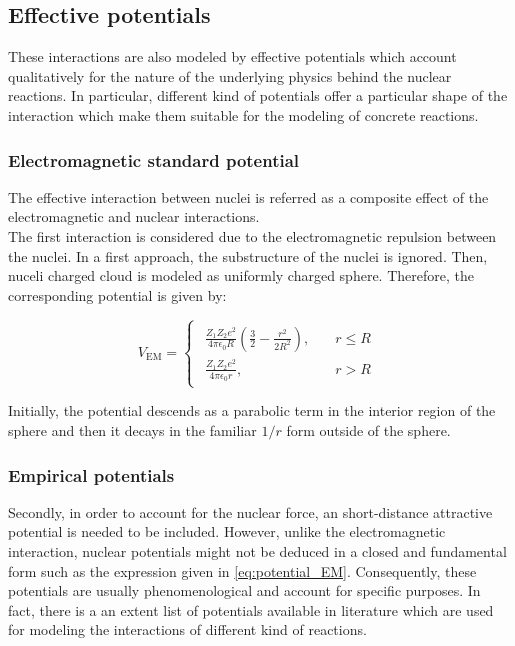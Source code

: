 \documentclass[openany]{book}
\begin{document}
\subsection{Effective potentials} \label{sub:potential_effective}

These interactions are also modeled by effective potentials which account qualitatively for the nature of the underlying physics behind the nuclear reactions. In particular, different kind of potentials offer a particular shape of the interaction which make them suitable for the modeling of concrete reactions.

\subsubsection{Electromagnetic standard potential} \label{sub:potential_effective_EM}

The effective interaction between nuclei is referred as a composite effect of the electromagnetic and nuclear interactions.  \\

The first interaction is considered due to the electromagnetic repulsion between the nuclei. In a first approach, the  substructure of the nuclei is ignored. Then, nuceli charged cloud is modeled as uniformly charged sphere. Therefore, the corresponding potential is given by:

\begin{equation} \label{eq:potential_EM}
	V_{\mathrm{EM}} = 	\left\{\begin{array}{l}
		\begin{split}
			\frac{Z_1Z_2e^2}{4\pi\epsilon_0R}\left(\frac{3}{2} - \frac{r^2}{2R^2}\right), \quad &r \le R \\ 
			\frac{Z_1Z_2e^2}{4\pi\epsilon_0r}, \quad &r > R	
		\end{split}
	\end{array}\right.
\end{equation}

Initially, the potential descends as a parabolic term in the interior region of the sphere and then it decays in the familiar $1/r$ form outside of the sphere. 

\subsubsection{Empirical potentials} \label{sub:potential_effective_empirical}

Secondly, in order to account for the nuclear force, an short-distance attractive potential is needed to be included. However, unlike the electromagnetic interaction, nuclear potentials might not be deduced  in a closed and fundamental form such as the expression given in \ref{eq:potential_EM}. Consequently, these  potentials are usually phenomenological and account for specific purposes. In fact, there is a an extent list of potentials available in literature which are used for modeling the interactions of different kind of reactions. \\
\end{document}
